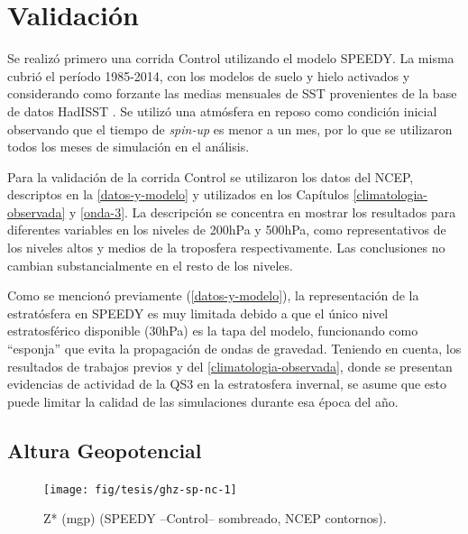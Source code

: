 \documentclass[spanish,a4paper,12pt,oneside]{book}
\begin{document}
\hypertarget{validacion}{%
\section{Validación}\label{validacion}}

Se realizó primero una corrida Control utilizando el modelo SPEEDY. La
misma cubrió el período 1985-2014, con los modelos de suelo y hielo
activados y considerando como forzante las medias mensuales de SST
provenientes de la base de datos HadISST \citep{Rayner2003}. Se utilizó
una atmósfera en reposo como condición inicial observando que el tiempo
de \emph{spin-up} es menor a un mes, por lo que se utilizaron todos los
meses de simulación en el análisis.

Para la validación de la corrida Control se utilizaron los datos del
NCEP, descriptos en la \autoref{datos-y-modelo} y utilizados en los
Capítulos \ref{climatologia-observada} y \ref{onda-3}. La descripción se
concentra en mostrar los resultados para diferentes variables en los
niveles de 200hPa y 500hPa, como representativos de los niveles altos y
medios de la troposfera respectivamente. Las conclusiones no cambian
substancialmente en el resto de los niveles.

Como se mencionó previamente (\autoref{datos-y-modelo}), la
representación de la estratósfera en SPEEDY es muy limitada debido a que
el único nivel estratosférico disponible (30hPa) es la tapa del modelo,
funcionando como ``esponja'' que evita la propagación de ondas de
gravedad. Teniendo en cuenta, los resultados de trabajos previos y del
\autoref{climatologia-observada}, donde se presentan evidencias de
actividad de la QS3 en la estratosfera invernal, se asume que esto puede
limitar la calidad de las simulaciones durante esa época del año.

\hypertarget{altura-geopotencial-1}{%
\subsection{Altura Geopotencial}\label{altura-geopotencial-1}}

\begin{landscape}\begin{figure}

{\centering \texttt{[image: fig/tesis/ghz-sp-nc-1]} 

}

\caption{Z* (mgp) (SPEEDY --Control-- sombreado, NCEP contornos).}\label{fig:ghz-sp-nc}
\end{figure}
\end{landscape}
\end{document}
